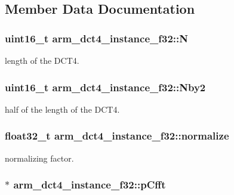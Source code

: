 \subsection{Member Data Documentation}
\hypertarget{structarm__dct4__instance__f32_a262b29a51c371b46efc89120e31ccf37}{
\subsubsection[{N}]{\setlength{\rightskip}{0pt plus 5cm}uint16\-\_\-t arm\-\_\-dct4\-\_\-instance\-\_\-f32\-::\-N}}\label{structarm__dct4__instance__f32_a262b29a51c371b46efc89120e31ccf37}
length of the D\-C\-T4. \hypertarget{structarm__dct4__instance__f32_adb1ef2739ddbe62e5cdadc47455a4147}{
\subsubsection[{Nby2}]{\setlength{\rightskip}{0pt plus 5cm}uint16\-\_\-t arm\-\_\-dct4\-\_\-instance\-\_\-f32\-::\-Nby2}}\label{structarm__dct4__instance__f32_adb1ef2739ddbe62e5cdadc47455a4147}
half of the length of the D\-C\-T4. \hypertarget{structarm__dct4__instance__f32_a61ce8c967b2e998a9c0041cca73cdef8}{
\subsubsection[{normalize}]{\setlength{\rightskip}{0pt plus 5cm}float32\-\_\-t arm\-\_\-dct4\-\_\-instance\-\_\-f32\-::normalize}}\label{structarm__dct4__instance__f32_a61ce8c967b2e998a9c0041cca73cdef8}
normalizing factor. \hypertarget{structarm__dct4__instance__f32_a018f7860b6e070af533fb7d76c7cdc32}{
\subsubsection[{p\-Cfft}]{$\ast$ arm\-\_\-dct4\-\_\-instance\-\_\-f32\-::p\-Cfft}}\label{structarm__dct4__instance__f32_a018f7860b6e070af533fb7d76c7cdc32}
